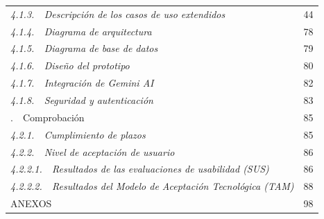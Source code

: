 \documentclass[12pt,a4paper,oneside]{report}
\begin{document}
\begin{tabularx}{\textwidth}{@{}Xr@{}}
\quad\quad \textit{4.1.3.\ \  Descripción de los casos de uso extendidos} \dotfill & 44 \\
\quad\quad \textit{4.1.4.\ \  Diagrama de arquitectura} \dotfill & 78 \\
\quad\quad \textit{4.1.5.\ \  Diagrama de base de datos} \dotfill & 79 \\
\quad\quad \textit{4.1.6.\ \  Diseño del prototipo} \dotfill & 80 \\
\quad\quad \textit{4.1.7.\ \  Integración de Gemini AI} \dotfill & 82 \\
\quad\quad \textit{4.1.8.\ \  Seguridad y autenticación} \dotfill & 83 \\
\quad 4.2.\ \  Comprobación \dotfill & 85 \\
\quad\quad \textit{4.2.1.\ \  Cumplimiento de plazos} \dotfill & 85 \\
\quad\quad \textit{4.2.2.\ \  Nivel de aceptación de usuario} \dotfill & 86 \\
\quad\quad\quad \textit{4.2.2.1.\ \  Resultados de las evaluaciones de usabilidad (SUS)} \dotfill & 86 \\
\quad\quad\quad \textit{4.2.2.2.\ \  Resultados del Modelo de Aceptación Tecnológica (TAM)} \dotfill & 88 \\
ANEXOS \dotfill & 98 \\
\end{tabularx}
\endgroup
\end{document}
